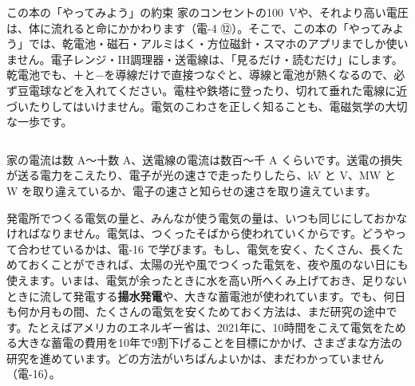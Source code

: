 \begin{column}{この本の「やってみよう」の約束}
家のコンセントの\qty{100}{V}や、それより高い電圧は、体に流れると命にかかわります（電-4 ⑫）。そこで、この本の「やってみよう」では、乾電池・磁石・アルミはく・方位磁針・スマホのアプリまでしか使いません。電子レンジ・IH調理器・送電線は、「見るだけ・読むだけ」にします。乾電池でも、＋と−を導線だけで直接つなぐと、導線と電池が熱くなるので、必ず豆電球などを入れてください。電柱や鉄塔に登ったり、切れて垂れた電線に近づいたりしてはいけません。電気のこわさを正しく知ることも、電磁気学の大切な一歩です。
\end{column}

\begin{phketa}[電気の旅の数]
家の電流は数 A〜十数 A、送電線の電流は数百〜千 A くらいです。送電の損失が送る電力をこえたり、電子が光の速さで走ったりしたら、kV と V、MW と W を取り違えているか、電子の速さと知らせの速さを取り違えています。
\end{phketa}

\begin{phmada}
発電所でつくる電気の量と、みんなが使う電気の量は、いつも同じにしておかなければなりません。電気は、つくったそばから使われていくからです。どうやって合わせているかは、電-16 で学びます。もし、電気を安く、たくさん、長くためておくことができれば、太陽の光や風でつくった電気を、夜や風のない日にも使えます。いまは、電気が余ったときに水を高い所へくみ上げておき、足りないときに流して発電する\textbf{揚水発電}や、大きな蓄電池が使われています。でも、何日も何か月もの間、たくさんの電気を安くためておく方法は、まだ研究の途中です。たとえばアメリカのエネルギー省は、2021年に、10時間をこえて電気をためる大きな蓄電の費用を10年で9割下げることを目標にかかげ、さまざまな方法の研究を進めています。どの方法がいちばんよいかは、まだわかっていません（電-16）。
\end{phmada}


\begin{kotoba}\small
{}
\end{kotoba}

